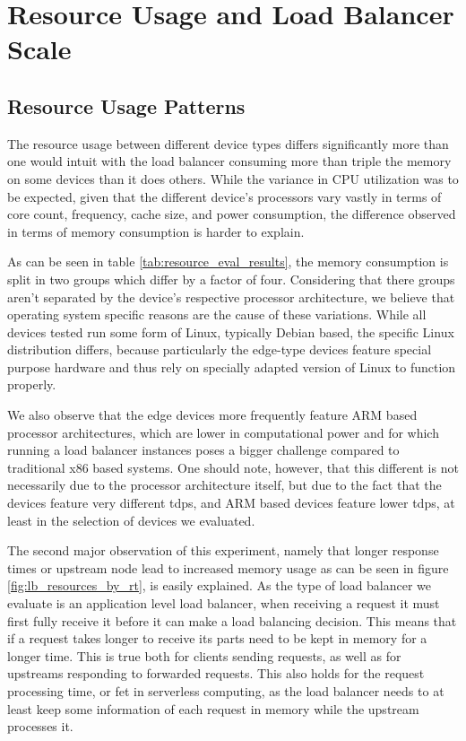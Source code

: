 \section{Resource Usage and Load Balancer Scale}
\subsection{Resource Usage Patterns}
The resource usage between different device types differs significantly more than one would intuit with the load balancer consuming more than triple the memory on some devices than it does others.
While the variance in CPU utilization was to be expected, given that the different device's processors vary vastly in terms of core count, frequency, cache size, and power consumption, the difference observed in terms of memory consumption is harder to explain.

As can be seen in table \ref{tab:resource_eval_results}, the memory consumption is split in two groups which differ by a factor of four. Considering that there groups aren't separated by the device's respective processor architecture, we believe that operating system specific reasons are the cause of these variations.
While all devices tested run some form of Linux, typically Debian based, the specific Linux distribution differs, because particularly the edge-type devices feature special purpose hardware and thus rely on specially adapted version of Linux to function properly.

We also observe that the edge devices more frequently feature ARM based processor architectures, which are lower in computational power and for which running a load balancer instances poses a bigger challenge compared to traditional x86 based systems. One should note, however, that this different is not necessarily due to the processor architecture itself, but due to the fact that the devices feature very different \glspl{tdp}, and ARM based devices feature lower \glspl{tdp}, at least in the selection of devices we evaluated.

The second major observation of this experiment, namely that longer response times or upstream node lead to increased memory usage as can be seen in figure \ref{fig:lb_resources_by_rt}, is  easily explained.
As the type of load balancer we evaluate is an application level load balancer, when receiving a request it must first fully receive it before it can make a load balancing decision.
This means that if a request takes longer to receive its parts need to be kept in memory for a longer time.
This is true both for clients sending requests, as well as for upstreams responding to forwarded requests.
This also holds for the request processing time, or \gls{fet} in serverless computing, as the load balancer needs to at least keep some information of each request in memory while the upstream processes it.




